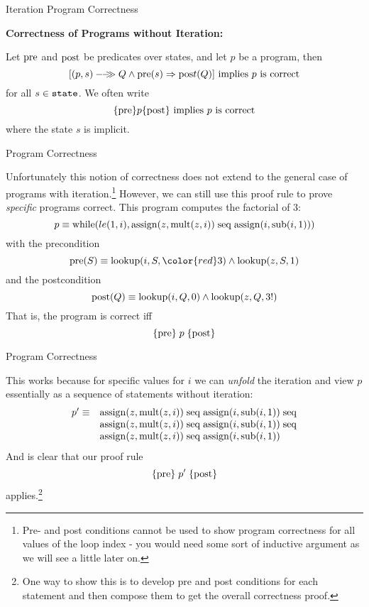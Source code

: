 \documentclass{beamer}
\begin{document}
\begin{frame}[fragile]{Iteration Program Correctness}

\small
{\bf Correctness of Programs without Iteration:}

\vspace{.1in}

Let $\rm pre$ and $\rm post$ be predicates over states, and let $p$
be a program, then 
\[
[{(p,s)}-\!\!-\!\!\!\!\gg{Q} \wedge {\rm pre}(s) \Rightarrow {\rm pos}t(Q)]\mbox{ implies $p$ is correct}
\]
for all $s \in {\tt state}$.  We often write
\[
\{{\rm pre}\} p \{{\rm post}\} \mbox{ implies $p$ is correct}
\]
where the state $s$ is implicit.



\end{frame}

\begin{frame}[fragile]{Program Correctness}

\small

Unfortunately this notion of correctness does not extend to the general case of programs
with iteration.\footnote{Pre- and post conditions cannot be used to show program correctness
for all values of the loop index - you would need some sort of inductive argument as we will
see a little later on.}
However, we can still use this proof rule to prove {\em specific} programs correct.  This
program computes the factorial of $3$:
\[
p \equiv {\rm while}(le(1,i), {\rm assign}(z,{\rm mult}(z,i)) \; {\rm seq}\; {\rm assign}(i,{\rm sub}(i,1)))
\]
with the precondition
\[
{\rm pre}(S) \equiv {\rm lookup}(i,S,{\color{red}3}) \wedge {\rm lookup}(z,S,1)
\]
and the postcondition
\[
{\rm post}(Q) \equiv {\rm lookup}(i,Q,0) \wedge {\rm lookup}(z,Q,3!)
\]
That is, the program is correct iff
\[
\{{\rm pre}\}\; p \; \{{\rm post}\}
\]
\end{frame}

\begin{frame}[fragile]{Program Correctness}

\small

This works because for specific values for $i$ we can {\em unfold} the iteration and view
$p$ essentially as a sequence of statements without iteration:
\[
\begin{array}{rl}
p'\equiv & {\rm assign}(z,{\rm mult}(z,i)) \; {\rm seq}\; {\rm assign}(i,{\rm sub}(i,1)) \;{\rm seq}\\
	& {\rm assign}(z,{\rm mult}(z,i)) \; {\rm seq}\; {\rm assign}(i,{\rm sub}(i,1)) \;{\rm seq}\\
          & {\rm assign}(z,{\rm mult}(z,i)) \; {\rm seq}\; {\rm assign}(i,{\rm sub}(i,1)) 
\end{array}
\]
And is clear that our proof rule
\[
\{{\rm pre}\}\; p' \; \{{\rm post}\}
\]
applies.\footnote{One way to show this is to develop pre and post conditions for each statement and
then compose them to get the overall correctness proof.}
\end{frame}
\end{document}
